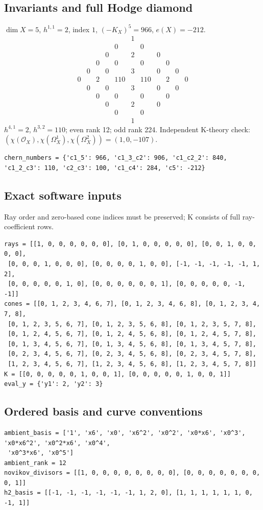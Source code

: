\documentclass[10pt,a4paper]{article}
\begin{document}
\subsection*{Invariants and full Hodge diamond}
$\dim X=5$, $h^{1,1}=2$, index $1$, $(-K_X)^5=966$, $e(X)=-212$.
\[\begin{array}{ccccccccccc}&&&&&1&&&&&\\&&&&0&&0&&&&\\&&&0&&2&&0&&&\\&&0&&0&&0&&0&&\\&0&&0&&3&&0&&0&\\0&&2&&110&&110&&2&&0\\&0&&0&&3&&0&&0&\\&&0&&0&&0&&0&&\\&&&0&&2&&0&&&\\&&&&0&&0&&&&\\&&&&&1&&&&&\end{array}\]
$h^{4,1}=2$, $h^{3,2}=110$; even rank 12; odd rank 224.
Independent K-theory check: $(\chi(\mathcal O_X),\chi(\Omega_X^1),\chi(\Omega_X^2))=(1, 0, -107)$.
\begin{lstlisting}
chern_numbers = {'c1_5': 966, 'c1_3_c2': 906, 'c1_c2_2': 840, 'c1_2_c3': 110, 'c2_c3': 100, 'c1_c4': 284, 'c5': -212}
\end{lstlisting}
\subsection*{Exact software inputs}
Ray order and zero-based cone indices must be preserved; K consists of full ray-coefficient rows.
\begin{lstlisting}
rays = [[1, 0, 0, 0, 0, 0, 0], [0, 1, 0, 0, 0, 0, 0], [0, 0, 1, 0, 0, 0, 0],
 [0, 0, 0, 1, 0, 0, 0], [0, 0, 0, 0, 1, 0, 0], [-1, -1, -1, -1, -1, 1, 2],
 [0, 0, 0, 0, 0, 1, 0], [0, 0, 0, 0, 0, 0, 1], [0, 0, 0, 0, 0, -1, -1]]
cones = [[0, 1, 2, 3, 4, 6, 7], [0, 1, 2, 3, 4, 6, 8], [0, 1, 2, 3, 4, 7, 8],
 [0, 1, 2, 3, 5, 6, 7], [0, 1, 2, 3, 5, 6, 8], [0, 1, 2, 3, 5, 7, 8],
 [0, 1, 2, 4, 5, 6, 7], [0, 1, 2, 4, 5, 6, 8], [0, 1, 2, 4, 5, 7, 8],
 [0, 1, 3, 4, 5, 6, 7], [0, 1, 3, 4, 5, 6, 8], [0, 1, 3, 4, 5, 7, 8],
 [0, 2, 3, 4, 5, 6, 7], [0, 2, 3, 4, 5, 6, 8], [0, 2, 3, 4, 5, 7, 8],
 [1, 2, 3, 4, 5, 6, 7], [1, 2, 3, 4, 5, 6, 8], [1, 2, 3, 4, 5, 7, 8]]
K = [[0, 0, 0, 0, 0, 1, 0, 0, 1], [0, 0, 0, 0, 0, 1, 0, 0, 1]]
eval_y = {'y1': 2, 'y2': 3}
\end{lstlisting}
\subsection*{Ordered basis and curve conventions}
\begin{lstlisting}
ambient_basis = ['1', 'x6', 'x0', 'x6^2', 'x0^2', 'x0*x6', 'x0^3', 'x0*x6^2', 'x0^2*x6', 'x0^4',
 'x0^3*x6', 'x0^5']
ambient_rank = 12
novikov_divisors = [[1, 0, 0, 0, 0, 0, 0, 0, 0], [0, 0, 0, 0, 0, 0, 0, 0, 1]]
h2_basis = [[-1, -1, -1, -1, -1, -1, 1, 2, 0], [1, 1, 1, 1, 1, 1, 0, -1, 1]]
\end{lstlisting}
\end{document}
